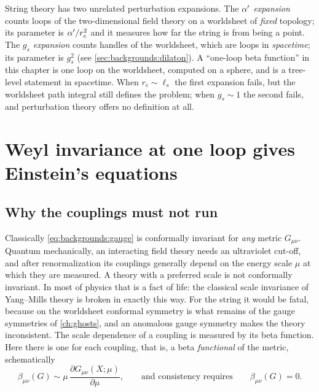 \begin{pitfallbox}
String theory has two unrelated perturbation expansions. The \emph{$\alpha'$ expansion} counts
loops of the two-dimensional field theory on a worldsheet of \emph{fixed} topology; its
parameter is $\alpha'/r_c^2$ and it measures how far the string is from being a point. The
\emph{$g_s$ expansion} counts handles of the worldsheet, which are loops in
\emph{spacetime}; its parameter is $g_s^2$ (see \cref{sec:backgrounds:dilaton}). A
``one-loop beta function'' in this chapter is one loop on the worldsheet, computed on a
sphere, and is a tree-level statement in spacetime. When $r_c\sim\ell_s$ the first expansion fails, but the worldsheet path integral still
defines the problem; when $g_s\sim1$ the second fails, and perturbation theory offers no
definition at all. 
\end{pitfallbox}

\section{Weyl invariance at one loop gives Einstein's equations}\label{sec:backgrounds:einstein}

\subsection{Why the couplings must not run}

Classically \eqref{eq:backgrounds:gauge} is conformally invariant for \emph{any} metric
$G_{\mu\nu}$. Quantum mechanically, an interacting field theory needs an ultraviolet cut-off,
and after renormalization its couplings generally depend on the energy scale $\mu$ at which
they are measured. A theory with a preferred scale is not conformally invariant. In most of
physics that is a fact of life: the classical scale invariance of Yang--Mills theory is
broken in exactly this way. For the string it would be fatal, because on the worldsheet
conformal symmetry is what remains of the gauge symmetries of \cref{ch:ghosts}, and an
anomalous gauge symmetry makes the theory inconsistent. The scale dependence of a coupling
is measured by its beta function. Here there is one for each coupling,
that is, a beta \emph{functional} of the metric, schematically
\begin{equation}\label{eq:backgrounds:betadef}
  \beta_{\mu\nu}(G)\sim\mu\,\frac{\partial G_{\mu\nu}(X;\mu)}{\partial\mu},
  \qquad\text{and consistency requires}\qquad \beta_{\mu\nu}(G)=0.
\end{equation}

